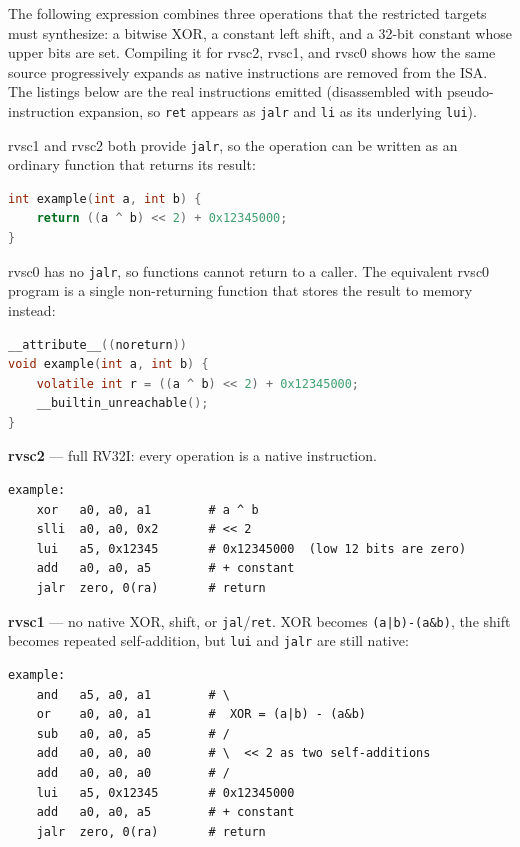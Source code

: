 The following expression combines three operations that the restricted targets must synthesize: a
bitwise XOR, a constant left shift, and a 32-bit constant whose upper bits are set. Compiling it for
rvsc2, rvsc1, and rvsc0 shows how the same source progressively expands as native instructions are
removed from the ISA. The listings below are the real instructions emitted (disassembled with
pseudo-instruction expansion, so \texttt{ret} appears as \texttt{jalr} and \texttt{li} as its
underlying \texttt{lui}).

rvsc1 and rvsc2 both provide \texttt{jalr}, so the operation can be written as an ordinary function
that returns its result:

\begin{lstlisting}[language=C]
int example(int a, int b) {
    return ((a ^ b) << 2) + 0x12345000;
}
\end{lstlisting}

rvsc0 has no \texttt{jalr}, so functions cannot return to a caller. The equivalent rvsc0 program is
a single non-returning function that stores the result to memory instead:

\begin{lstlisting}[language=C]
__attribute__((noreturn))
void example(int a, int b) {
    volatile int r = ((a ^ b) << 2) + 0x12345000;
    __builtin_unreachable();
}
\end{lstlisting}

\textbf{rvsc2} --- full RV32I: every operation is a native instruction.

\begin{lstlisting}
example:
    xor   a0, a0, a1        # a ^ b
    slli  a0, a0, 0x2       # << 2
    lui   a5, 0x12345       # 0x12345000  (low 12 bits are zero)
    add   a0, a0, a5        # + constant
    jalr  zero, 0(ra)       # return
\end{lstlisting}

\textbf{rvsc1} --- no native XOR, shift, or \texttt{jal}/\texttt{ret}. XOR becomes
\texttt{(a|b)-(a\&b)}, the shift becomes repeated self-addition, but \texttt{lui} and \texttt{jalr}
are still native:

\begin{lstlisting}
example:
    and   a5, a0, a1        # \
    or    a0, a0, a1        #  XOR = (a|b) - (a&b)
    sub   a0, a0, a5        # /
    add   a0, a0, a0        # \  << 2 as two self-additions
    add   a0, a0, a0        # /
    lui   a5, 0x12345       # 0x12345000
    add   a0, a0, a5        # + constant
    jalr  zero, 0(ra)       # return
\end{lstlisting}

